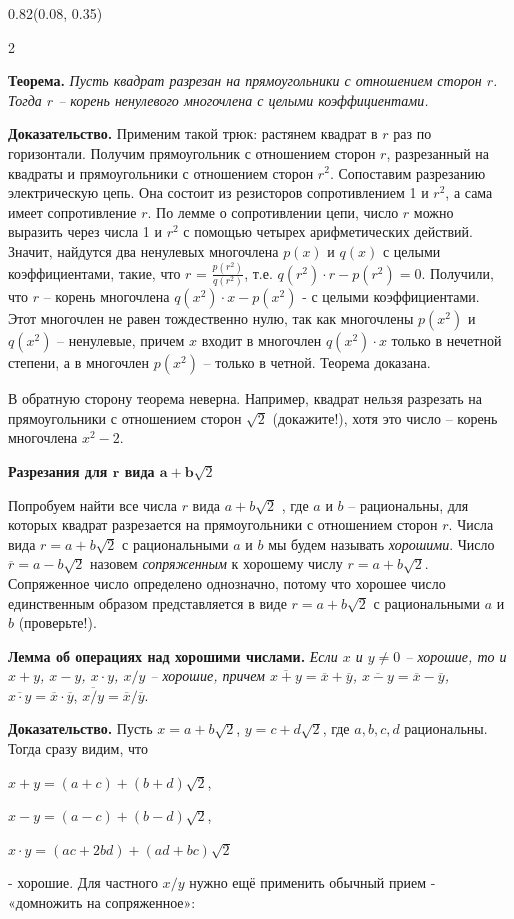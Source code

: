 \begin{textblock*}{0.82\paperwidth}(0.08\paperheight, 0.35\paperwidth)
    \begin{multicols}{2}
    {
    \justifying
    \textbf{Теорема.} \textit{Пусть квадрат разрезан на прямоугольники с отношением сторон $r$. Тогда $r$ – корень ненулевого многочлена с целыми коэффициентами.} \par \textbf{Доказательство.} Применим такой трюк: растянем квадрат в $r$ раз по горизонтали. Получим прямоугольник с отношением сторон $r$, разрезанный на квадраты и прямоугольники с отношением сторон $r^2$. Сопоставим разрезанию электрическую цепь. Она состоит из резисторов сопротивлением 1 и $r^2$, а сама имеет сопротивление $r$. По лемме о сопротивлении цепи, число $r$ можно выразить через числа 1 и $r^2$ с помощью четырех арифметических действий. Значит, найдутся два ненулевых многочлена $p(x)$ и $q(x)$ с целыми коэффициентами, такие, что $r$ = $\frac{p(r^2)}{q(r^2)}$, т.е. $q(r^2) \cdot r - p(r^2) = 0$. Получили, что $r$ – корень многочлена $q(x^2) \cdot x - p(x^2)$ - с целыми коэффициентами. Этот многочлен не равен тождественно нулю, так как многочлены $p(x^2)$ и $q(x^2)$ – ненулевые, причем $x$ входит в многочлен $q(x^2) \cdot x$ только в нечетной степени, а в многочлен $p(x^2)$ – только в четной. Теорема доказана. \par В обратную сторону теорема неверна. Например, квадрат нельзя разрезать на прямоугольники с отношением сторон $\sqrt{2}$ (докажите!), хотя это число – корень многочлена $x^2 - 2$. \par \centerline{\textbf{Разрезания для $\mathbf{r}$ вида $\mathbf{a} + \mathbf{b}\sqrt{2}$}} Попробуем найти все числа $r$ вида $a + b\sqrt{2}$ , где $a$ и $b$ – рациональны, для которых квадрат разрезается на прямоугольники с отношением сторон $r$. Числа вида $r = a + b\sqrt{2}$ с рациональными $a$ и $b$ мы будем называть \textit{хорошими}. Число $\overline{r} = a - b\sqrt{2}$ назовем \textit{сопряженным} к хорошему числу $r = a + b\sqrt{2}$. Сопряженное число определено однозначно, потому что хорошее число единственным образом представляется в виде $r = a + b\sqrt{2}$ с рациональными $a$ и $b$ (проверьте!). \par \textbf{Лемма об операциях над хорошими числами.} \textit{Если $x$ и $y \neq 0$ – хорошие, то и $x + y$, $x - y$, $x \cdot y$, $x/y$ – хорошие, причем $\overline{x + y} = \overline{x} + \overline{y}$, $\overline{x - y} = \overline{x} - \overline{y}$, $\overline{x \cdot y} = \overline{x} \cdot \overline{y}$}, $\overline{x/y} = \overline{x}/\overline{y}$. \par \textbf{Доказательство.} Пусть $x = a + b\sqrt{2}$, $y = c + d\sqrt{2}$, где $a, b, c, d$ рациональны. Тогда сразу видим, что \par \centerline{$x + y = (a + c) + (b + d)\sqrt{2}$,} \par \centerline{$x - y = (a - c) + (b - d)\sqrt{2}$,} \par \centerline{$x \cdot y = (ac + 2bd) + (ad + bc)\sqrt{2}$} \par - хорошие. Для частного $x/y$ нужно ещё применить обычный прием - «домножить на сопряженное»: \par 
}
\end{multicols}
\end{textblock*}
